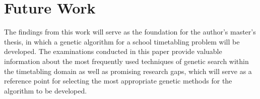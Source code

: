 \documentclass[sigconf]{acmart}
\begin{document}
\section{Future Work}
The findings from this work will serve as the foundation for the author's
master's thesis, in which a genetic algorithm for a school timetabling problem
will be developed.
The examinations conducted in this paper provide valuable information about the
most frequently used techniques of genetic search within the timetabling domain
as well as promising research gaps,
which will serve as a reference point for selecting the most appropriate
genetic methods for the algorithm to be developed.



\balance %






\end{document}
